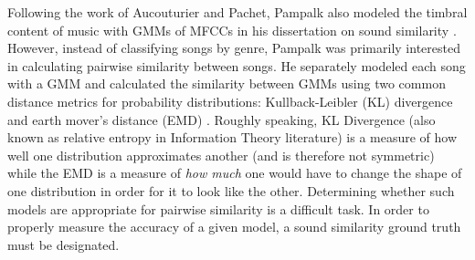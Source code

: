 \documentclass[12pt]{report} 	%
\numberwithin{figure}{chapter}
\numberwithin{table}{chapter}
\numberwithin{equation}{chapter}
\begin{document}
\begin{flushleft}
Following the work of Aucouturier and Pachet, Pampalk also modeled the timbral content of music with GMMs of MFCCs in his dissertation on sound similarity \cite{Pampalk:2006pr}. However, instead of classifying songs by genre, Pampalk was primarily interested in calculating pairwise similarity between songs. He separately modeled each song with a GMM and calculated the similarity between GMMs using two common distance metrics for probability distributions: Kullback-Leibler (KL) divergence and earth mover's distance (EMD) \cite[p. 26]{Pampalk:2006pr}. Roughly speaking, KL Divergence (also known as relative entropy in Information Theory literature) is a measure of how well one distribution approximates another (and is therefore not symmetric) while the EMD is a measure of \textit{how much} one would have to change the shape of one distribution in order for it to look like the other. Determining whether such models are appropriate for pairwise similarity is a difficult task. In order to properly measure the accuracy of a given model, a sound similarity ground truth must be designated.


\end{flushleft}
\end{document}
